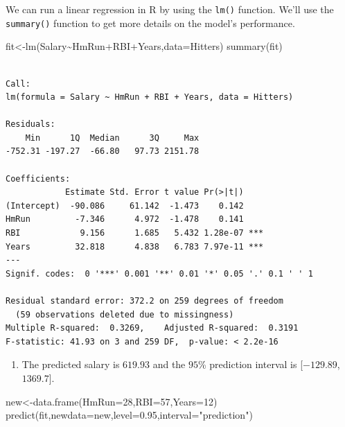 \documentclass[
  letterpaper,
  DIV=11,
  numbers=noendperiod]{scrreprt}
\newenvironment{Shaded}{\begin{snugshade}}{\end{snugshade}}
\newcommand{\AttributeTok}[1]{\textcolor[rgb]{0.40,0.45,0.13}{#1}}
\newcommand{\DecValTok}[1]{\textcolor[rgb]{0.68,0.00,0.00}{#1}}
\newcommand{\FloatTok}[1]{\textcolor[rgb]{0.68,0.00,0.00}{#1}}
\newcommand{\FunctionTok}[1]{\textcolor[rgb]{0.28,0.35,0.67}{#1}}
\newcommand{\NormalTok}[1]{\textcolor[rgb]{0.00,0.23,0.31}{#1}}
\newcommand{\OtherTok}[1]{\textcolor[rgb]{0.00,0.23,0.31}{#1}}
\newcommand{\SpecialCharTok}[1]{\textcolor[rgb]{0.37,0.37,0.37}{#1}}
\newcommand{\StringTok}[1]{\textcolor[rgb]{0.13,0.47,0.30}{#1}}
\providecommand{\tightlist}{%
  \setlength{\itemsep}{0pt}\setlength{\parskip}{0pt}}\usepackage{longtable,booktabs,array}
\begin{document}
We can run a linear regression in R by using the \texttt{lm()} function.
We'll use the \texttt{summary()} function to get more details on the
model's performance.

\begin{Shaded}
\begin{Highlighting}[numbers=left,,]
\NormalTok{fit}\OtherTok{\textless{}{-}}\FunctionTok{lm}\NormalTok{(Salary}\SpecialCharTok{\textasciitilde{}}\NormalTok{HmRun}\SpecialCharTok{+}\NormalTok{RBI}\SpecialCharTok{+}\NormalTok{Years,}\AttributeTok{data=}\NormalTok{Hitters)}
\FunctionTok{summary}\NormalTok{(fit)}
\end{Highlighting}
\end{Shaded}

\begin{verbatim}

Call:
lm(formula = Salary ~ HmRun + RBI + Years, data = Hitters)

Residuals:
    Min      1Q  Median      3Q     Max 
-752.31 -197.27  -66.80   97.73 2151.78 

Coefficients:
            Estimate Std. Error t value Pr(>|t|)    
(Intercept)  -90.086     61.142  -1.473    0.142    
HmRun         -7.346      4.972  -1.478    0.141    
RBI            9.156      1.685   5.432 1.28e-07 ***
Years         32.818      4.838   6.783 7.97e-11 ***
---
Signif. codes:  0 '***' 0.001 '**' 0.01 '*' 0.05 '.' 0.1 ' ' 1

Residual standard error: 372.2 on 259 degrees of freedom
  (59 observations deleted due to missingness)
Multiple R-squared:  0.3269,    Adjusted R-squared:  0.3191 
F-statistic: 41.93 on 3 and 259 DF,  p-value: < 2.2e-16
\end{verbatim}

\begin{enumerate}
\def\labelenumi{\arabic{enumi}.}
\setcounter{enumi}{1}
\tightlist
\item
  The predicted salary is \(619.93\) and the \(95\)\% prediction
  interval is {[}\(-129.89\),\(1369.7\){]}.
\end{enumerate}

\begin{Shaded}
\begin{Highlighting}[numbers=left,,]
\NormalTok{new}\OtherTok{\textless{}{-}}\FunctionTok{data.frame}\NormalTok{(}\AttributeTok{HmRun=}\DecValTok{28}\NormalTok{,}\AttributeTok{RBI=}\DecValTok{57}\NormalTok{,}\AttributeTok{Years=}\DecValTok{12}\NormalTok{)}
\FunctionTok{predict}\NormalTok{(fit,}\AttributeTok{newdata=}\NormalTok{new,}\AttributeTok{level=}\FloatTok{0.95}\NormalTok{,}\AttributeTok{interval=}\StringTok{"prediction"}\NormalTok{)}
\end{Highlighting}
\end{Shaded}
\end{document}
